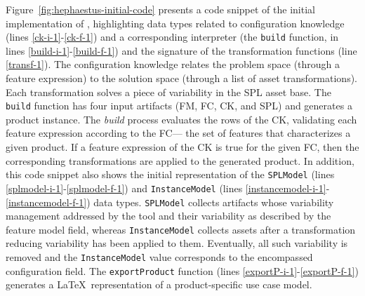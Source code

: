 Figure~\ref{fig:hephaestus-initial-code} presents a code snippet of
the initial implementation of \hp{}, highlighting data types
related to configuration knowledge (lines \ref{ck-i-1}-\ref{ck-f-1})
and a corresponding interpreter (the \texttt{build} function, in lines
\ref{build-i-1}-\ref{build-f-1}) and the signature of the
transformation functions (line \ref{transf-1}). The configuration
knowledge relates the problem space (through a feature expression) to
the solution space (through a list of asset transformations). Each
transformation solves a piece of variability in the SPL asset
base. The \texttt{build} function has four input artifacts (FM, FC,
CK, and SPL) and generates a product instance. The \textit{build}
process evaluates the rows of the CK, validating each feature
expression according to the FC--- the set of features that
characterizes a given product. If a feature expression of the CK is
true for the given FC, then the corresponding transformations are
applied to the generated product.  In addition, this code snippet also
shows the initial representation of the \texttt{SPLModel} (lines
\ref{splmodel-i-1}-\ref{splmodel-f-1}) and \texttt{InstanceModel}
(lines \ref{instancemodel-i-1}-\ref{instancemodel-f-1}) data
types. \texttt{SPLModel} collects artifacts whose variability management
addressed by the tool and their variability as described by the
feature model field, whereas \texttt{InstanceModel} collects assets after
a transformation reducing variability has been applied to
them. Eventually, all such variability is removed and the
\texttt{InstanceModel} value corresponds to the encompassed
configuration field. The \texttt{exportProduct} function (lines
\ref{exportP-i-1}-\ref{exportP-f-1}) generates a \LaTeX\
representation of a product-specific use case model.


